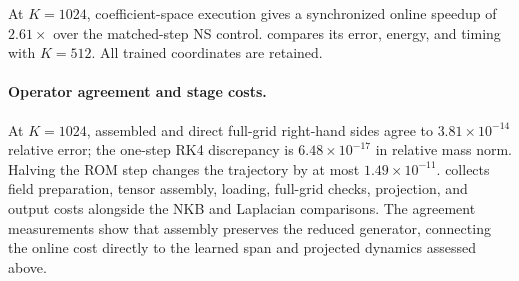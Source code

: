 At $K=1024$, coefficient-space execution gives a synchronized online speedup of $2.61\times$ over the matched-step NS control.  compares its error, energy, and timing with $K=512$. All trained coordinates are retained.

\paragraph{Operator agreement and stage costs.}
At $K=1024$, assembled and direct full-grid right-hand sides agree to $3.81\times10^{-14}$ relative error; the one-step RK4 discrepancy is $6.48\times10^{-17}$ in relative mass norm. Halving the ROM step changes the trajectory by at most $1.49\times10^{-11}$. {} collects field preparation, tensor assembly, loading, full-grid checks, projection, and output costs alongside the NKB and Laplacian comparisons. The agreement measurements show that assembly preserves the reduced generator, connecting the online cost directly to the learned span and projected dynamics assessed above.
